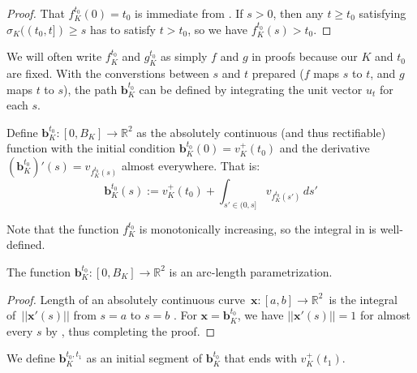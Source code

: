 \begin{proof}
That \(f_K^{t_0}(0) = t_0\) is immediate from . If \(s > 0\), then any \(t \geq t_0\) satisfying \(\sigma_K((t_0, t]) \geq s\) has to satisfy \(t > t_0\), so we have \(f_K^{t_0}(s) > t_0\).
\end{proof}

We will often write \(f_K^{t_0}\) and \(g_K^{t_0}\) as simply \(f\) and \(g\) in proofs because our \(K\) and \(t_0\) are fixed. With the converstions between \(s\) and \(t\) prepared (\(f\) maps \(s\) to \(t\), and \(g\) maps \(t\) to \(s\)), the path \(\mathbf{b}_{K}^{t_0}\) can be defined by integrating the unit vector \(u_t\) for each \(s\).

\begin{definition}

Define \(\mathbf{b}_{K}^{t_0} : [0, B_K] \to \mathbb{R}^2\) as the absolutely continuous (and thus rectifiable) function with the initial condition \(\mathbf{b}_{K}^{t_0}(0) = v_K^+(t_0)\) and the derivative \(\left(\mathbf{b}_{K}^{t_0}\right)'(s) = v_{f_K^{t_0}(s)}\) almost everywhere. That is:
\[
\mathbf{b}_{K}^{t_0}(s) := v_K^+(t_0) + \int_{s' \in (0, s]} v_{f_K^{t_0}(s')} \, ds'
\]

\label{def:parametrization-formal}
\end{definition}

Note that the function \(f_{K}^{t_0}\) is monotonically increasing, so the integral in  is well-defined.

\begin{proposition}

The function \(\mathbf{b}_{K}^{t_0} : [0, B_K] \to \mathbb{R}^2\) is an arc-length parametrization.

\label{pro:parametrization-arc-length}
\end{proposition}

\begin{proof}
Length of an absolutely continuous curve~\(\mathbf{x} : [a, b] \to \mathbb{R}^2\)~is the integral of~\(| | \mathbf{x}'(s) | |\) from \(s=a\) to \(s=b\) \autocite{jones2001lebesgue}. For \(\mathbf{x} = \mathbf{b}_K^{t_0}\), we have \(| | \mathbf{x}'(s) | | = 1\) for almost every \(s\) by , thus completing the proof.
\end{proof}

We define \(\mathbf{b}_K^{t_0, t_1}\) as an initial segment of \(\mathbf{b}_K^{t_0}\) that ends with \(v_K^+(t_1)\).

